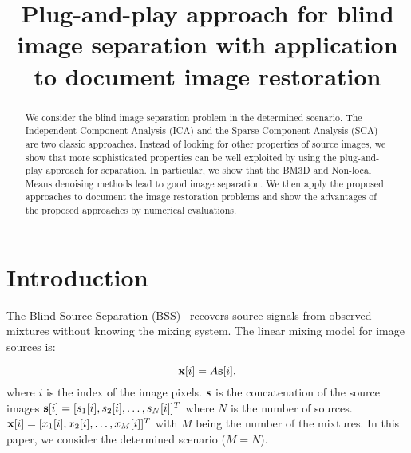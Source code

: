 \documentclass[conference]{IEEEtran}
\theoremstyle{plain}
\begin{document}
\title{Plug-and-play approach for blind image separation with application to document image restoration}

\author{
}	

\maketitle

\begin{abstract}
We consider the blind image separation problem in the determined scenario. The Independent Component Analysis (ICA) and the Sparse Component Analysis (SCA) are two classic approaches. Instead of looking for other properties of source images, we show that more sophisticated properties can be well exploited by using the plug-and-play approach for separation. In particular, we show that the BM3D and Non-local Means denoising methods lead to good image separation. We then apply the proposed approaches to document the image restoration problems and show the advantages of the proposed approaches by numerical evaluations. 
\end{abstract}


\section{Introduction}
The Blind Source Separation (BSS)~\cite{comon2010handbook} recovers source signals from observed mixtures without knowing the mixing system. The linear mixing model for image sources is:

\begin{equation}
\label{eq: linear mixing}
\bx[i] = A \bs[i],
\end{equation}
where $i$ is the index of the image pixels. ${\mathbf s}$ is the concatenation of the source images ${\mathbf s}[i] = [s_1[i], s_2[i], \ldots, s_N[i]]^T$ where $N$ is the number of sources. ${\mathbf x}[i] = [x_1[i], x_2[i], \ldots, x_M[i]]^T$ with $M$ being the number of the mixtures. In this paper, we consider the determined scenario ($M = N$).
\end{document}
